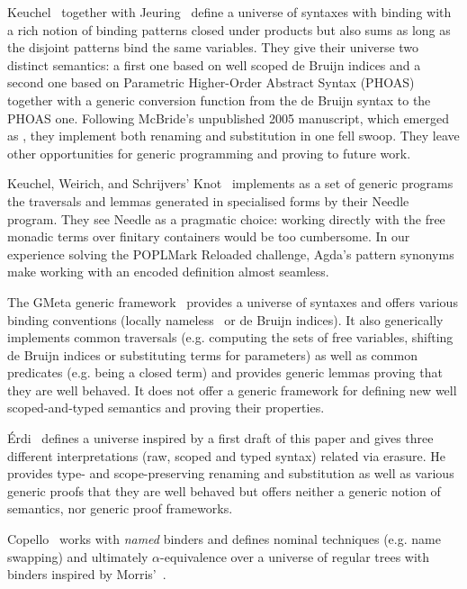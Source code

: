 Keuchel~\citeyear{Keuchel:Thesis:2011} together with Jeuring~\citeyear{DBLP:conf/icfp/KeuchelJ12}
define a universe of syntaxes with binding with a rich notion of binding patterns
closed under products but also sums as long as the disjoint patterns bind the same
variables. They give their universe two distinct semantics: a first one based on well
scoped de Bruijn indices and a second one based on Parametric Higher-Order Abstract
Syntax (PHOAS)~\cite{DBLP:conf/icfp/Chlipala08} together with a generic conversion
function from the de Bruijn syntax to the PHOAS one. Following McBride's unpublished 2005 manuscript, which emerged as \cite{benton2012strongly},
they implement both renaming and substitution in one fell swoop. They leave other
opportunities for generic programming and proving to future work.

Keuchel, Weirich, and Schrijvers' Knot~\citeyear{needleandknot} implements
as a set of generic programs the traversals and lemmas generated in specialised
forms by their Needle program. They see Needle as a pragmatic choice: working
directly with the free monadic terms over finitary containers would be too cumbersome. In
our experience solving the POPLMark Reloaded challenge, Agda's pattern
synonyms make working with an encoded definition almost
seamless.

The GMeta generic framework~\citeyear{gmeta} provides a universe of syntaxes
and offers various binding conventions (locally nameless~\cite{Chargueraud2012}
or de Bruijn indices). It also generically implements common traversals (e.g. computing
the sets of free variables,
shifting
de Bruijn indices or substituting terms for parameters) as well as common
predicates (e.g. being a closed term) and provides generic lemmas proving that
they are well behaved. It does not offer a generic framework
for defining new well scoped-and-typed semantics and proving their properties.

Érdi~\citeyear{gergodraft} defines a universe inspired by a first draft of this
paper and gives three different interpretations (raw, scoped and typed syntax)
related via erasure. He provides type- and scope-preserving renaming and
substitution as well as various generic proofs that they are well behaved but
offers neither a generic notion of semantics, nor generic proof frameworks.

Copello~\citeyear{copello2017} works with \emph{named} binders and
defines nominal techniques (e.g. name swapping) and ultimately $\alpha$-equivalence
over a universe of regular trees with binders inspired by Morris'~\citeyear{morris-regulartt}.

